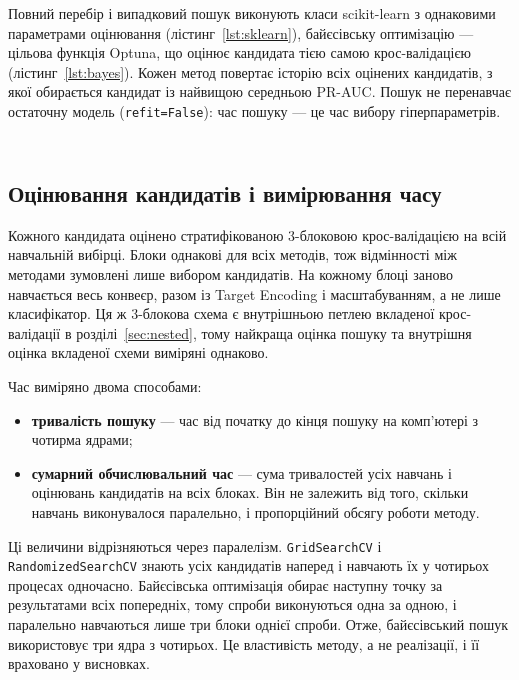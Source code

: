 \documentclass[14pt,a4paper]{extreport}
\begin{document}
Повний перебір і випадковий пошук виконують класи scikit-learn з однаковими параметрами оцінювання (лістинг~\ref{lst:sklearn}), байєсівську оптимізацію --- цільова функція Optuna, що оцінює кандидата тією самою крос-валідацією (лістинг~\ref{lst:bayes}). Кожен метод повертає історію всіх оцінених кандидатів, з якої обирається кандидат із найвищою середньою PR-AUC. Пошук не перенавчає остаточну модель (\texttt{refit=False}): час пошуку --- це час вибору гіперпараметрів.

\inputminted[firstline=244,lastline=261]{python}{../src/mk1/tuning.py}
\label{lst:sklearn}

\inputminted[firstline=309,lastline=325]{python}{../src/mk1/tuning.py}
\label{lst:bayes}

\subsection{Оцінювання кандидатів і вимірювання часу}

Кожного кандидата оцінено стратифікованою 3-блоковою крос-валідацією на всій навчальній вибірці. Блоки однакові для всіх методів, тож відмінності між методами зумовлені лише вибором кандидатів. На кожному блоці заново навчається весь конвеєр, разом із Target Encoding і масштабуванням, а не лише класифікатор. Ця ж 3-блокова схема є внутрішньою петлею вкладеної крос-валідації в розділі~\ref{sec:nested}, тому найкраща оцінка пошуку та внутрішня оцінка вкладеної схеми виміряні однаково.

Час виміряно двома способами:

\begin{itemize}
\item \textbf{тривалість пошуку} --- час від початку до кінця пошуку на комп'ютері з чотирма ядрами;
\item \textbf{сумарний обчислювальний час} --- сума тривалостей усіх навчань і оцінювань кандидатів на всіх блоках. Він не залежить від того, скільки навчань виконувалося паралельно, і пропорційний обсягу роботи методу.
\end{itemize}

Ці величини відрізняються через паралелізм. \texttt{GridSearchCV} і \texttt{RandomizedSearchCV} знають усіх кандидатів наперед і навчають їх у чотирьох процесах одночасно. Байєсівська оптимізація обирає наступну точку за результатами всіх попередніх, тому спроби виконуються одна за одною, і паралельно навчаються лише три блоки однієї спроби. Отже, байєсівський пошук використовує три ядра з чотирьох. Це властивість методу, а не реалізації, і її враховано у висновках.
\end{document}
